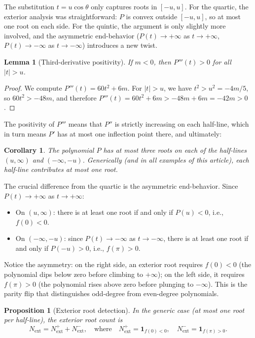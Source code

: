 \documentclass[12pt]{article}
\newtheorem{lemma}[theorem]{Lemma}
\newtheorem{proposition}[theorem]{Proposition}
\newtheorem{corollary}[theorem]{Corollary}
\theoremstyle{definition}
\theoremstyle{remark}
\begin{document}
The substitution $t = u\cos\theta$ only captures roots in $[-u,u]$. For the quartic, the exterior analysis was straightforward: $P$ is convex outside $[-u,u]$, so at most one root on each side. For the quintic, the argument is only slightly more involved, and the asymmetric end-behavior ($P(t) \to +\infty$ as $t \to +\infty$, $P(t) \to -\infty$ as $t \to -\infty$) introduces a new twist.

\begin{lemma}[Third-derivative positivity]\label{lem:Pppp}
If $m < 0$, then $P'''(t) > 0$ for all $|t| > u$.
\end{lemma}

\begin{proof}
We compute $P'''(t) = 60t^2 + 6m$. For $|t| > u$, we have $t^2 > u^2 = -4m/5$, so $60t^2 > -48m$, and therefore $P'''(t) = 60t^2 + 6m > -48m + 6m = -42m > 0$.
\end{proof}

The positivity of $P'''$ means that $P''$ is strictly increasing on each half-line, which in turn means $P'$ has at most one inflection point there, and ultimately:

\begin{corollary}\label{cor:ext_bound}
The polynomial $P$ has at most three roots on each of the half-lines $(u, \infty)$ and $(-\infty, -u)$. Generically (and in all examples of this article), each half-line contributes at most one root.
\end{corollary}

The crucial difference from the quartic is the asymmetric end-behavior. Since $P(t) \to +\infty$ as $t \to +\infty$:
\begin{itemize}
\item On $(u, \infty)$: there is at least one root if and only if $P(u) < 0$, i.e., $f(0) < 0$.
\item On $(-\infty, -u)$: since $P(t) \to -\infty$ as $t \to -\infty$, there is at least one root if and only if $P(-u) > 0$, i.e., $f(\pi) > 0$.
\end{itemize}

Notice the asymmetry: on the right side, an exterior root requires $f(0) < 0$ (the polynomial dips below zero before climbing to $+\infty$); on the left side, it requires $f(\pi) > 0$ (the polynomial rises above zero before plunging to $-\infty$). This is the parity flip that distinguishes odd-degree from even-degree polynomials.

\begin{proposition}[Exterior root detection]\label{prop:exterior}
In the generic case (at most one root per half-line), the exterior root count is
\begin{equation}\label{eq:Next}
N_{\mathrm{ext}} = N_{\mathrm{ext}}^{+} + N_{\mathrm{ext}}^{-}, \quad\text{where}\quad N_{\mathrm{ext}}^{+} = \mathbf{1}_{f(0)<0}, \quad N_{\mathrm{ext}}^{-} = \mathbf{1}_{f(\pi)>0}.
\end{equation}
\end{proposition}
\end{document}

